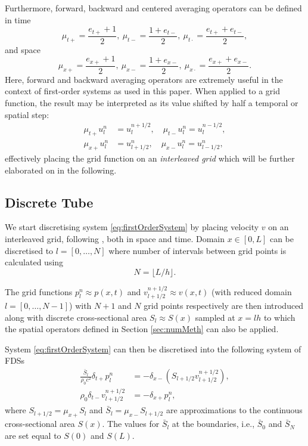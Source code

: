 Furthermore, forward, backward and centered averaging operators can be defined in time
\begin{equation}
    \mu_{t+} = \frac{e_{t+} + 1}{2}, \ \mu_{t-} = \frac{1 + e_{t-}}{2}, \ \mu_{t\cdot} = \frac{e_{t+}+e_{t-}}{2},
\end{equation}
and space
\begin{equation}
    \mu_{x+} = \frac{e_{x+} + 1}{2}, \ \mu_{x-} = \frac{1 + e_{x-}}{2}, \ \mu_{x\cdot} = \frac{e_{x+}+e_{x-}}{2}.
\end{equation}
Here, forward and backward averaging operators are extremely useful in the context of first-order systems as used in this paper. When applied to a grid function, the result may be interpreted as its value shifted by half a temporal or spatial step: 
\begin{align}
    \mu_{t+}u_l^n &= u_l^{n+1/2}, \quad \mu_{t-}u_l^n = u_l^{n-1/2},\\
    \mu_{x+}u_l^n &= u_{l+1/2}^n, \quad \mu_{x-}u_l^n = u_{l-1/2}^n,
\end{align}
effectively placing the grid function on an \textit{interleaved grid} which will be further elaborated on in the following. 

\subsection{Discrete Tube}\label{sec:discSyst}
We start discretising system \eqref{eq:firstOrderSystem} by placing velocity $v$ on an interleaved grid, following \cite{Harrison2018}, both in space and time. Domain $x\in [0, L]$ can be discretised to $l = [0, \hdots, N]$ where number of intervals between grid points is calculated using 
\begin{equation}\label{eq:numberOfIntervals}
    N=\lfloor L/h\rfloor.
\end{equation}

The grid functions $p_l^n \approx p(x,t)$ and $v_{l+1/2}^{n+1/2} \approx v(x,t)$ (with reduced domain $l = [0, \hdots, N-1]$) with $N+1$ and $N$ grid points respectively are then introduced along with discrete cross-sectional area $S_l\approx S(x)$ sampled at $x = lh$ to which the spatial operators defined in Section \ref{sec:numMeth} can also be applied.

System \eqref{eq:firstOrderSystem} can then be discretised into the following system of FDSs
\begin{subequations}\label{eq:FDS}
    \begin{align}
        \frac{\bar S_l}{\rho_0 c^2}\delta_{t+}p_l^n &= -\delta_{x-}(S_{l+1/2}v_{l+1/2}^{n+1/2}),\label{eq:discPressure}\\
        \rho_0 \delta_{t-}v_{l+1/2}^{n+1/2}&=-\delta_{x+}p_l^n,\label{eq:discVelocity}
    \end{align}
\end{subequations}
where $S_{l+1/2} = \mu_{x+}S_l$ and $\bar S_l = \mu_{x-}S_{l+1/2}$ are approximations to the continuous cross-sectional area $S(x)$. The values for $\bar S_l$ at the boundaries, i.e., $\bar S_0$ and $\bar S_N$ are set equal to $S(0)$ and $S(L)$.

